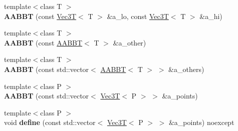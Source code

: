 \begin{DoxyCompactItemize}
{\footnotesize template$<$class T $>$ }\\{\bfseries A\+A\+B\+BT} (const \hyperlink{classVec3T}{Vec3T}$<$ T $>$ \&a\+\_\+lo, const \hyperlink{classVec3T}{Vec3T}$<$ T $>$ \&a\+\_\+hi)
\item 
\mbox{\label{classEBGeometry_1_1BoundingVolumes_1_1AABBT_afca4bd6cb8b2adab62868e10b1be5052}} 
{\footnotesize template$<$class T $>$ }\\{\bfseries A\+A\+B\+BT} (const \hyperlink{classEBGeometry_1_1BoundingVolumes_1_1AABBT}{A\+A\+B\+BT}$<$ T $>$ \&a\+\_\+other)
\item 
\mbox{\label{classEBGeometry_1_1BoundingVolumes_1_1AABBT_a3d68ad3207db77d1a844193085bc3818}} 
{\footnotesize template$<$class T $>$ }\\{\bfseries A\+A\+B\+BT} (const std\+::vector$<$ \hyperlink{classEBGeometry_1_1BoundingVolumes_1_1AABBT}{A\+A\+B\+BT}$<$ T $>$ $>$ \&a\+\_\+others)
\item 
\mbox{\label{classEBGeometry_1_1BoundingVolumes_1_1AABBT_a81b76c881d564ac8a8a2b98f90a0319d}} 
{\footnotesize template$<$class P $>$ }\\{\bfseries A\+A\+B\+BT} (const std\+::vector$<$ \hyperlink{classVec3T}{Vec3T}$<$ P $>$ $>$ \&a\+\_\+points)
\item 
\mbox{\label{classEBGeometry_1_1BoundingVolumes_1_1AABBT_a71467f66f1d9c1622c750273ca79946a}} 
{\footnotesize template$<$class P $>$ }\\void {\bfseries define} (const std\+::vector$<$ \hyperlink{classVec3T}{Vec3T}$<$ P $>$ $>$ \&a\+\_\+points) noexcept
\end{DoxyCompactItemize}
